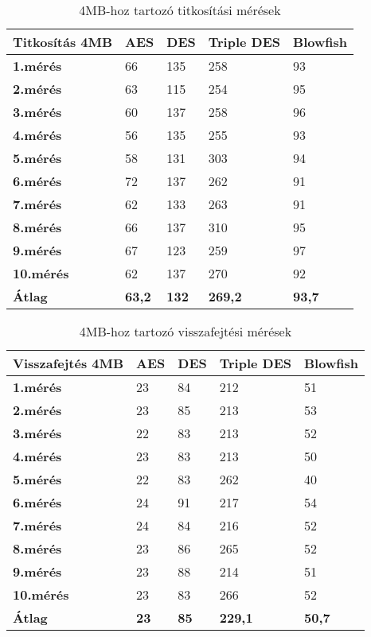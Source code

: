 \begin{table}[H]
	\centering
	\caption{4MB-hoz tartozó titkosítási mérések}
	\label{tab:enc_4mb}
	\medskip
	\begin{tabular}{|p{2.4cm}|p{2cm}|p{2cm}|p{2cm}|p{2cm}|}
		\hline
		\textbf{Titkosítás} \newline \textbf{4MB} & \textbf{AES} & \textbf{DES} & \textbf{Triple DES} & \textbf{Blowfish}\\
		\hline
		\textbf{1.mérés} & 66 & 135 & 258 & 93\\
		\hline
		\textbf{2.mérés} & 63 & 115 & 254 & 95\\
		\hline
		\textbf{3.mérés} & 60 & 137 & 258 & 96\\
		\hline
		\textbf{4.mérés} & 56 & 135 & 255 & 93\\
		\hline
		\textbf{5.mérés} & 58 & 131 & 303 & 94\\
		\hline
		\textbf{6.mérés} & 72 & 137 & 262 & 91\\
		\hline
		\textbf{7.mérés} & 62 & 133 & 263 & 91\\
		\hline
		\textbf{8.mérés} & 66 & 137 & 310 & 95\\
		\hline
		\textbf{9.mérés} & 67 & 123 & 259 & 97\\
		\hline
		\textbf{10.mérés} & 62 & 137 & 270 & 92\\
		\hline
		\hline
		\textbf{Átlag} & \textbf{63,2} & \textbf{132} & \textbf{269,2} & \textbf{93,7}\\
		\hline
	\end{tabular}
\end{table}

\begin{table}[H]
	\centering
	\caption{4MB-hoz tartozó visszafejtési mérések}
	\label{tab:dec_4mb}
	\medskip
	\begin{tabular}{|p{2.4cm}|p{2cm}|p{2cm}|p{2cm}|p{2cm}|}
		\hline
		\textbf{Visszafejtés} \newline \textbf{4MB} & \textbf{AES} & \textbf{DES} & \textbf{Triple DES} & \textbf{Blowfish}\\
		\hline
		\textbf{1.mérés} & 23 & 84 & 212 & 51\\
		\hline
		\textbf{2.mérés} & 23 & 85 & 213 & 53\\
		\hline
		\textbf{3.mérés} & 22 & 83 & 213 & 52\\
		\hline
		\textbf{4.mérés} & 23 & 83 & 213 & 50\\
		\hline
		\textbf{5.mérés} & 22 & 83 & 262 & 40\\
		\hline
		\textbf{6.mérés} & 24 & 91 & 217 & 54\\
		\hline
		\textbf{7.mérés} & 24 & 84 & 216 & 52\\
		\hline
		\textbf{8.mérés} & 23 & 86 & 265 & 52\\
		\hline
		\textbf{9.mérés} & 23 & 88 & 214 & 51\\
		\hline
		\textbf{10.mérés} & 23 & 83 & 266 & 52\\
		\hline
		\hline
		\textbf{Átlag} & \textbf{23} & \textbf{85} & \textbf{229,1} & \textbf{50,7}\\
		\hline
	\end{tabular}
\end{table}